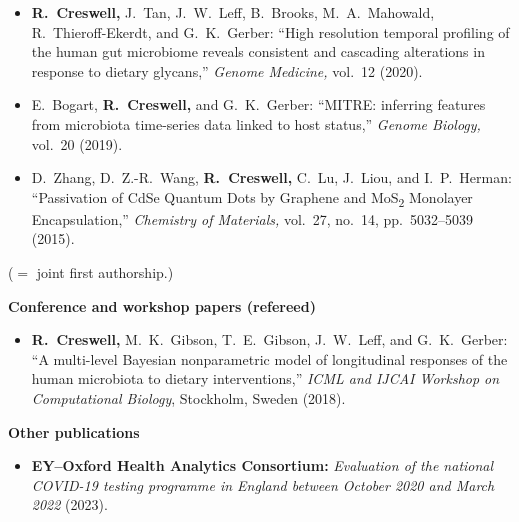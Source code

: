 \documentclass[11pt]{article}
\begin{document}
\begin{itemize}[leftmargin=*]
\item \textbf{R.\ Creswell,\textsuperscript{\dag}} {\color{gray}J.\ Tan,\textsuperscript{\dag} J.\ W.\ Leff, B.\ Brooks, M.\ A.\ Mahowald, R.\ Thieroff-Ekerdt, and G.\ K.\ Gerber:} ``High resolution temporal profiling of the human gut microbiome reveals consistent and cascading alterations in response to dietary glycans,'' \emph{Genome Medicine,} vol.\ 12 (2020).

\item {\color{gray} E.\ Bogart, \textbf{\color{black}R.\ Creswell,} and G.\ K.\ Gerber:} ``MITRE: inferring features from microbiota time-series data linked to host status,'' \emph{Genome Biology,} vol.\ 20 (2019).

\item {\color{gray} D.\ Zhang, D.\ Z.-R.\ Wang, \textbf{\color{black}R.\ Creswell,} C.\ Lu, J.\ Liou, and I.\ P.\ Herman:} ``Passivation of CdSe Quantum Dots by Graphene and MoS\textsubscript{2} Monolayer Encapsulation,'' \emph{Chemistry of Materials,} vol.\ 27, no.\ 14, pp.\ 5032--5039 (2015).
\end{itemize}
\hfill(\textsuperscript{\dag}$=$ joint first authorship.)

\vspace*{.4cm}
\noindent\textbf{Conference and workshop papers (refereed)}
\vspace*{.5cm}
\begin{itemize}[leftmargin=*]
\setlength{\itemsep}{4pt}
\setlength{\parskip}{0pt}
\setlength{\parsep}{0pt}
\vspace{-.5cm}
\item \textbf{R.\ Creswell,} {\color{gray} M.\ K.\ Gibson, T.\ E.\ Gibson, J.\ W.\ Leff, and G.\ K.\ Gerber:} ``A multi-level Bayesian nonparametric model of longitudinal responses of the human microbiota to dietary interventions,'' \emph{ICML and IJCAI
Workshop on Computational Biology}, Stockholm, Sweden (2018).
\end{itemize}





\vspace*{.4cm}
\noindent\textbf{Other publications}
\vspace*{.5cm}
\begin{itemize}[leftmargin=*]
\setlength{\itemsep}{4pt}
\setlength{\parskip}{0pt}
\setlength{\parsep}{0pt}
\vspace{-.5cm}
\item \textbf{EY--Oxford Health Analytics Consortium:} \emph{Evaluation of the national COVID-19 testing programme in England between October 2020 and March 2022} (2023).


\end{itemize}
\end{document}
